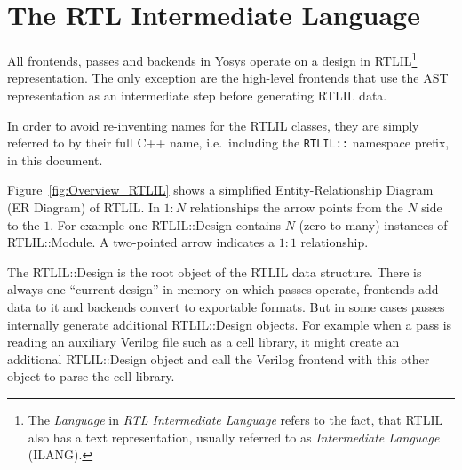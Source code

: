 \section{The RTL Intermediate Language}

All frontends, passes and backends in Yosys operate on a design in RTLIL\footnote{The {\it Language} in {\it RTL Intermediate Language}
refers to the fact, that RTLIL also has a text representation, usually referred to as {\it Intermediate Language} (ILANG).} representation.
The only exception are the high-level frontends that use the AST representation as an intermediate step before generating RTLIL
data.

In order to avoid re-inventing names for the RTLIL classes, they are simply referred to by their full C++ name, i.e.~including
the {\tt RTLIL::} namespace prefix, in this document.

Figure~\ref{fig:Overview_RTLIL} shows a simplified Entity-Relationship Diagram (ER Diagram) of RTLIL. In $1:N$ relationships the arrow
points from the $N$ side to the $1$. For example one RTLIL::Design contains $N$ (zero to many) instances of RTLIL::Module.
A two-pointed arrow indicates a $1:1$ relationship.

The RTLIL::Design is the root object of the RTLIL data structure. There is always one ``current design'' in memory
on which passes operate, frontends add data to it and backends convert to exportable formats. But in some cases passes
internally generate additional RTLIL::Design objects. For example when a pass is reading an auxiliary Verilog file such
as a cell library, it might create an additional RTLIL::Design object and call the Verilog frontend with this
other object to parse the cell library.

